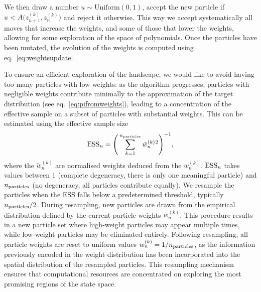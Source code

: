 \documentclass[11pt,a4paper]{article}
\begin{document}
	We then draw a number $u\sim \mathrm{Uniform}(0,1)$, accept the new particle if $u<A\big(z_{n+1}^{(k)},z_{n}^{(k)}\big)$ and reject it otherwise. This way we accept systematically all moves that increase the weights, and some of those that lower the weights, allowing for some exploration of the space of polynomials.	Once the particles have been mutated, the evolution of the weights is computed using eq.~\eqref{eq:weightsupdate}.

	To ensure an efficient exploration of the landscape, we would like to avoid having too many particles with low weights: as the algorithm progresses, particles with negligible weights contribute minimally to the approximation of the target distribution (see eq.~\eqref{eq:pifromweights}), leading to a concentration of the effective sample on a subset of particles with substantial weights. This can be estimated using the effective sample size~\cite{ca54d442-d5bd-32ea-a920-38aa7d8a4043}
	\begin{equation}
		{\rm ESS}_{n} = \Bigg(\sum_{k=1}^{n_{\rm particles}} \tilde{w}^{(k)}_{n}{}^{2}\Bigg)^{-1},
	\end{equation}
	where the $\tilde{w}^{(k)}_{n}$ are normalised weights deduced from the $w^{(k)}_{n}$. ${\rm ESS}_{n}$ takes values between $1$ (complete degeneracy, there is only one meaningful particle) and $n_{\rm particles}$ (no degeneracy, all particles contribute equally). We resample the particles when the ESS falls below a predetermined threshold, typically $n_{\rm particles}/2$. During resampling, new particles are drawn from the empirical distribution defined by the current particle weights $\tilde{w}^{(k)}_{n}$.	This procedure results in a new particle set where high-weight particles may appear multiple times, while low-weight particles may be eliminated entirely. Following resampling, all particle weights are reset to uniform values $w_{n}^{(k)} = 1/n_{\rm particles}$, as the information previously encoded in the weight distribution has been incorporated into the spatial distribution of the resampled particles. This resampling mechanism ensures that computational resources are concentrated on exploring the most promising regions of the state space.
\end{document}
